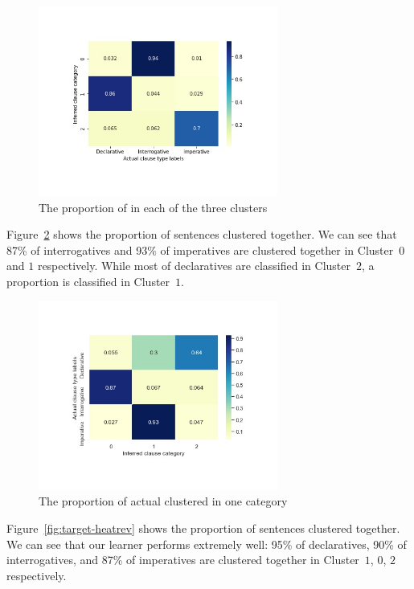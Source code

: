 \begin{figure}[H]
    \centering
    \includegraphics[width=0.7\textwidth]{figures/target-heatmap.jpg}
    \caption{The proportion of \diis{} in each of the three clusters}
    \label{fig:target-heatmap}
\end{figure}

Figure~\ref{fig:baseline-heatrev} shows the proportion of sentences clustered together. We can see that 87\% of interrogatives and 93\% of imperatives are clustered together in Cluster~$0$ and $1$ respectively. While most of declaratives are classified in Cluster~$2$, a proportion is classified in Cluster~$1$.

\begin{figure}[H]
    \centering
    \includegraphics[width=0.7\textwidth]{figures/baseline-heatrev.jpg}
    \caption{The proportion of actual \diis{} clustered in one category}
    \label{fig:baseline-heatrev}
\end{figure}

Figure~\ref{fig:target-heatrev} shows the proportion of sentences clustered together. We can see that our learner performs extremely well: 95\% of declaratives, 90\% of interrogatives, and 87\% of imperatives are clustered together in Cluster~$1$, $0$, $2$ respectively.


